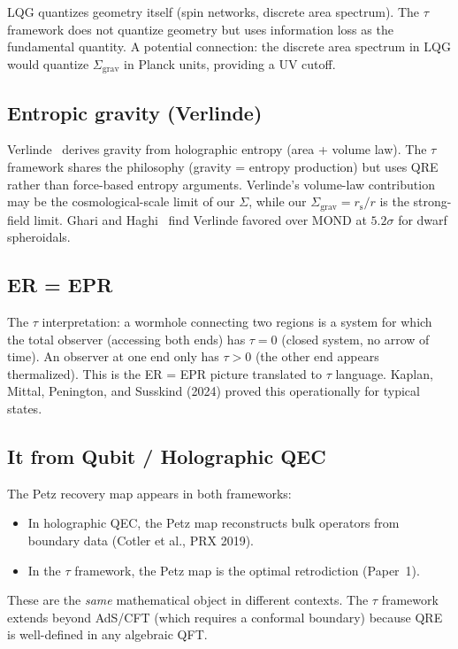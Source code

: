 \documentclass[aps,prd,preprint,superscriptaddress,longbibliography]{revtex4-2}
\newcommand{\tauasym}{\tau}
\newcommand{\rs}{r_{\mathrm{s}}}
\begin{document}
LQG quantizes geometry itself (spin networks, discrete area spectrum).
The $\tauasym$ framework does not quantize geometry but uses
information loss as the fundamental quantity.  A potential connection:
the discrete area spectrum in LQG would quantize
$\Sigma_{\mathrm{grav}}$ in Planck units, providing a UV cutoff.

\subsection{Entropic gravity (Verlinde)}

Verlinde~\cite{Verlinde2016} derives gravity from holographic
entropy (area + volume law).  The $\tauasym$ framework shares the
philosophy (gravity = entropy production) but uses QRE rather than
force-based entropy arguments.  Verlinde's volume-law contribution
may be the cosmological-scale limit of our $\Sigma$, while our
$\Sigma_{\mathrm{grav}} = \rs/r$ is the strong-field limit.
Ghari and Haghi~\cite{GhariHaghi2026} find Verlinde favored over
MOND at $5.2\sigma$ for dwarf spheroidals.

\subsection{ER = EPR}

The $\tauasym$ interpretation: a wormhole connecting two regions is
a system for which the total observer (accessing both ends) has
$\tauasym = 0$ (closed system, no arrow of time).  An observer
at one end only has $\tauasym > 0$ (the other end appears
thermalized).  This is the ER = EPR picture translated to $\tauasym$
language.  Kaplan, Mittal, Penington, and Susskind (2024) proved
this operationally for typical states.

\subsection{It from Qubit / Holographic QEC}

The Petz recovery map appears in both frameworks:
\begin{itemize}
\item In holographic QEC, the Petz map reconstructs bulk operators
  from boundary data (Cotler et al., PRX 2019).
\item In the $\tauasym$ framework, the Petz map is the optimal
  retrodiction (Paper~1).
\end{itemize}

These are the \emph{same} mathematical object in different contexts.
The $\tauasym$ framework extends beyond AdS/CFT (which requires a
conformal boundary) because QRE is well-defined in any algebraic QFT.
\end{document}
